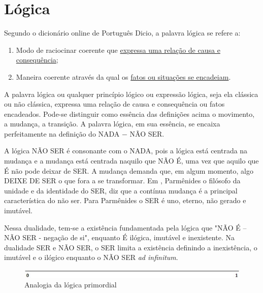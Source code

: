 \section{Lógica}
Segundo o dicionário online de Português Dicio\cite{dicio_logica}, a palavra lógica se refere a:
	\begin{enumerate}
	   \item Modo de raciocinar coerente que \underline{expressa uma relação de causa e consequência};
	   \item Maneira coerente através da qual os \underline{fatos ou situações se encadeiam}. 
	\end{enumerate}
 
\bigbreak
A palavra lógica ou qualquer princípio lógico ou expressão lógica, seja ela clássica ou não clássica, expressa uma relação de causa e consequência ou fatos encadeados. Pode-se distinguir como essência das definições acima o movimento, a mudança, a transição. A palavra lógica, em sua essência, se encaixa perfeitamente na definição do NADA − NÃO SER. 

A lógica NÃO SER é consonante com o NADA, pois a lógica está centrada na mudança e a mudança está centrada naquilo que NÃO É, uma vez que aquilo que É não pode deixar de SER. A mudança demanda que, em algum momento, algo DEIXE DE SER o que fora a se transformar. Em , Parmênides  o filósofo da unidade e da identidade do SER, diz que a contínua mudança é a principal característica do não ser. Para Parmênides o SER é uno, eterno, não gerado e imutável.

Nessa dualidade, tem-se a existência fundamentada pela lógica que "NÃO É – NÃO SER - negação de si", enquanto É ilógica, imutável e inexistente. Na dualidade SER e NÃO SER, o SER limita a existência definindo a inexistência, o imutável e o ilógico enquanto o NÃO SER \textit{ad infinitum}.
	\begin{figure}[H]
	\caption{Analogia da lógica primordial}
	\label{fig:primordial_logic_representation}
	\centering
	\includegraphics[scale=1]{sections/images/primordial_logic_representation.jpg}
	\end{figure}

